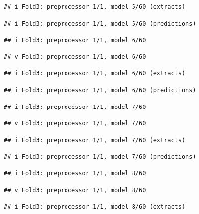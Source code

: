 \documentclass[
]{article}
\begin{document}
\begin{verbatim}
## i Fold3: preprocessor 1/1, model 5/60 (extracts)
\end{verbatim}

\begin{verbatim}
## i Fold3: preprocessor 1/1, model 5/60 (predictions)
\end{verbatim}

\begin{verbatim}
## i Fold3: preprocessor 1/1, model 6/60
\end{verbatim}

\begin{verbatim}
## v Fold3: preprocessor 1/1, model 6/60
\end{verbatim}

\begin{verbatim}
## i Fold3: preprocessor 1/1, model 6/60 (extracts)
\end{verbatim}

\begin{verbatim}
## i Fold3: preprocessor 1/1, model 6/60 (predictions)
\end{verbatim}

\begin{verbatim}
## i Fold3: preprocessor 1/1, model 7/60
\end{verbatim}

\begin{verbatim}
## v Fold3: preprocessor 1/1, model 7/60
\end{verbatim}

\begin{verbatim}
## i Fold3: preprocessor 1/1, model 7/60 (extracts)
\end{verbatim}

\begin{verbatim}
## i Fold3: preprocessor 1/1, model 7/60 (predictions)
\end{verbatim}

\begin{verbatim}
## i Fold3: preprocessor 1/1, model 8/60
\end{verbatim}

\begin{verbatim}
## v Fold3: preprocessor 1/1, model 8/60
\end{verbatim}

\begin{verbatim}
## i Fold3: preprocessor 1/1, model 8/60 (extracts)
\end{verbatim}
\end{document}
